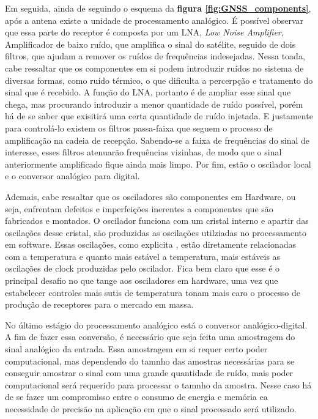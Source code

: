 Em seguida, ainda de seguindo o esquema da \textbf{figura \ref{fig:GNSS_components}}, após a antena existe a unidade de processamento analógico. É possível observar que essa parte do receptor é composta por um LNA, \textit{Low Noise Amplifier}, Amplificador de baixo ruído, que amplifica o sinal do satélite, seguido de dois filtros, que ajudam a remover os ruídos de frequências indesejadas. Nessa toada, cabe ressaltar que os componentes em si podem introduzir ruídos no sistema de diversas formas, como ruído térmico, o que dificulta a percerpção e tratamento do sinal que é recebido. A função do LNA, portanto é de ampliar esse sinal que chega, mas procurando introduzir a menor quantidade de ruído possível, porém há de se saber que exisitirá uma certa quantidade de ruído injetada. E justamente para controlá-lo existem os filtros passa-faixa que seguem o processo de amplificação na cadeia de recepção. Sabendo-se a faixa de frequências do sinal de interesse, esses filtros atenuarão frequências vizinhas, de modo que o sinal anteriormente amplificado fique ainda mais limpo. Por fim, estão o oscilador local e o conversor analógico para digital. 
 
Ademais, cabe ressaltar que os osciladores são componentes em Hardware, ou seja, enfrentam defeitos e imperfeições inerentes a componentes que são fabricados e montados. O oscilador funciona com um cristal interno e apartir das oscilações desse cristal, são produzidas as oscilações utilziadas no processamento em software. Essas oscilações, como explicita \cite{Antreich2022}, estão diretamente relacionadas com a temperatura e quanto mais estável a temperatura, mais estáveis as oscilações de clock produzidas pelo oscilador. Fica bem claro que esse é o principal desafio no que tange aos osciladores em hardware, uma vez que estabelecer controles mais sutis de temperatura tonam mais caro o processo de produção de receptores para o mercado em massa.

No último estágio do processamento analógico está o conversor analógico-digital. A fim de fazer essa conversão, é necessário que seja feita uma amostragem do sinal analógico da entrada. Essa amostragem em si requer certo poder computacional, mas dependendo do tamnho das amostras necessárias para se conseguir amostrar o sinal com uma grande quantidade de ruído, mais poder computacional será requerido para processar o tamnho da amostra. Nesse caso há de se fazer um compromisso entre o consumo de energia e memória ea necessidade de precisão na aplicação em que o sinal processado será utilizado.

